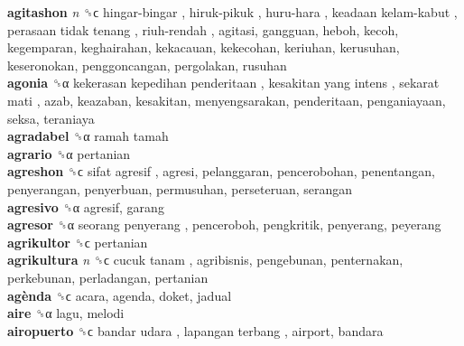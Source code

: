 \textbf{agitashon} \emph{n}  ␝ϲ   hingar-bingar ,  hiruk-pikuk ,  huru-hara ,  keadaan kelam-kabut ,  perasaan tidak tenang ,  riuh-rendah , agitasi, gangguan, heboh, kecoh, kegemparan, keghairahan, kekacauan, kekecohan, keriuhan, kerusuhan, keseronokan, penggoncangan, pergolakan, rusuhan  \\
\textbf{agonia} ␝α   kekerasan kepedihan penderitaan ,  kesakitan yang intens ,  sekarat mati , azab, keazaban, kesakitan, menyengsarakan, penderitaan, penganiayaan, seksa, teraniaya  \\
\textbf{agradabel} ␝α   ramah tamah   \\
\textbf{agrario} ␝α  pertanian  \\
\textbf{agreshon} ␝ϲ   sifat agresif , agresi, pelanggaran, pencerobohan, penentangan, penyerangan, penyerbuan, permusuhan, perseteruan, serangan  \\
\textbf{agresivo} ␝α  agresif, garang  \\
\textbf{agresor} ␝α   seorang penyerang , penceroboh, pengkritik, penyerang, peyerang  \\
\textbf{agrikultor} ␝ϲ  pertanian  \\
\textbf{agrikultura} \emph{n}  ␝ϲ   cucuk tanam , agribisnis, pengebunan, penternakan, perkebunan, perladangan, pertanian  \\
\textbf{agènda} ␝ϲ  acara, agenda, doket, jadual  \\
\textbf{aire} ␝α  lagu, melodi  \\
\textbf{airopuerto} ␝ϲ   bandar udara ,  lapangan terbang , airport, bandara  \\
